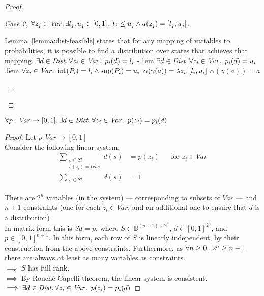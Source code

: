 \begin{prop}[Correctness]
\begin{proof}
\begin{proof}[Case 2, {$\forall z_j\in\mathit{Var}\ldotp\exists l_j,u_j\in[0,1]\ldotp~l_j\leq u_j\wedge a(z_j) = [l_j,u_j]$}]
\begin{itemize}
\begin{itemize}
        \end{itemize}
        \step Lemma~\ref{lemma:dist-feasible} states that for any mapping of variables to probabilities, it is possible to find a distribution over states that achieves that mapping.
        \step[\imps] $\exists d\in\mathit{Dist}\ldotp\forall z_i\in\mathit{Var}\ldotp~p_i(d) = l_i$
        \itemsep-.1em
        \step[\wedge] $\exists d\in\mathit{Dist}\ldotp\forall z_i\in\mathit{Var}\ldotp~p_i(d) = u_i$
        \itemsep.5em
        \step[\imps] $\forall z_i\in\mathit{Var}\ldotp~\inf(P_i) = l_i \wedge\sup(P_i) = u_i$
        \step[\imps] $\alpha(\gamma(a)) = \lambda z_i\ldotp[l_i,u_i]$
        \step[\imps] $\alpha(\gamma(a)) = a$\qedhere
      \end{itemize}
    \end{proof}
  \end{proof}
\end{prop}

\begin{lemma}\label{lemma:dist-feasible}
  $\forall p : \mathit{Var}\to[0,1]\ldotp\exists d\in\mathit{Dist}\ldotp\forall z_i\in\mathit{Var}\ldotp~p(z_i) = p_i(d)$
  \begin{proof}
    Let $p : \mathit{Var}\to[0,1]$\\
    \noindent
    Consider the following linear system:
    \begin{align*}
      \sum_{\substack{s\in\mathit{St}\\s(z_i)=\mathit{true}}}d(s) & = p(z_i) &&\text{for } z_i\in\mathit{Var}\\
      \sum_{\substack{s\in\mathit{St}\\\phantom{s(z_i)=\mathit{true}}}} d(s) & = 1
    \end{align*}
    There are $2^n$ variables (in the system) --- corresponding to subsets of $\mathit{Var}$ --- and $n + 1$ constraints (one for each $z_i\in\mathit{Var}$, and an additional one to ensure that $d$ is a distribution)\\[1em]

    In matrix form this is $Sd = p$, where ${S\in\mathbb{B}^{(n+1)\times2^n}}$, ${d\in[0,1]^{2^n}}$, and ${p\in[0,1]^{n+1}}$. In this form, each row of $S$ is linearly independent, by their construction from the above constraints. Furthermore, as $\forall n\geq 0\ldotp~2^n\geq n+1$ there are always at least as many variables as constraints.\\[1em]

    \noindent
    $\implies$ $S$ has full rank.\\[1em]

    \noindent
    $\implies$ By Rouch\'e-Capelli theorem, the linear system is consistent.\\[1em]

    \noindent
    $\implies \exists d\in\mathit{Dist}\ldotp\forall z_i\in\mathit{Var}\ldotp~p(z_i) = p_i(d)$\qedhere
  \end{proof}
\end{lemma}

